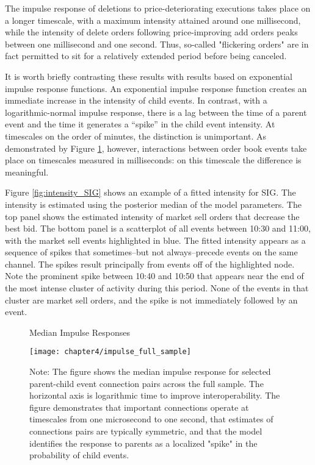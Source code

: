 		The impulse response of deletions to price-deteriorating executions takes place on a longer timescale, with a maximum intensity attained around one millisecond, while the intensity of delete orders following price-improving add orders peaks between one millisecond and one second. Thus, so-called "flickering orders" are in fact permitted to sit for a relatively extended period before being canceled.

		It is worth briefly contrasting these results with results based on exponential impulse response functions. An exponential impulse response function creates an immediate increase in the intensity of child events. In contrast, with a logarithmic-normal impulse response, there is a lag between the time of a parent event and the time it generates a “spike” in the child event intensity. At timescales on the order of minutes, the distinction is unimportant. As demonstrated by Figure \ref{fig:impulse_full_sample}, however, interactions between order book events take place on timescales measured in milliseconds: on this timescale the difference is meaningful.

		Figure \ref{fig:intensity_SIG} shows an example of a fitted intensity for SIG. The intensity is estimated using the posterior median of the model parameters. The top panel shows the estimated intensity of market sell orders that decrease the best bid. The bottom panel is a scatterplot of all events between 10:30 and 11:00, with the market sell events highlighted in blue. The fitted intensity appears as a sequence of spikes that sometimes--but not always--precede events on the same channel. The spikes result principally from events off of the highlighted node. Note the prominent spike between 10:40 and 10:50 that appears near the end of the most intense cluster of activity during this period. None of the events in that cluster are market sell orders, and the spike is not immediately followed by an event.

		\begin{figure}[ht!]
			\small
			\linespread{1}
			\centering
			\captionsetup{labelsep=colon, font=footnotesize, justification=centerfirst, width=\linewidth}
			\caption{Median Impulse Responses}
			\label{fig:impulse_full_sample}
			\texttt{[image: chapter4/impulse\_full\_sample]}
			\captionsetup{position=below, font=footnotesize, justification=justified, width=\linewidth}
			\caption*{Note: The figure shows the median impulse response for selected parent-child event connection pairs across the full sample. The horizontal axis is logarithmic time to improve interoperability. The figure demonstrates that important connections operate at timescales from one microsecond to one second, that estimates of connections pairs are typically symmetric, and that the model identifies the response to parents as a localized "spike" in the probability of child events.}
		\end{figure}

